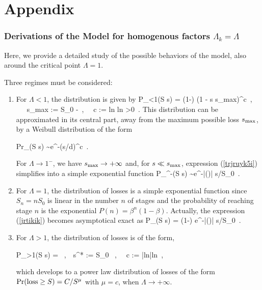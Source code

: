 \section*{Appendix}



\subsubsection{Derivations of the Model for homogenous factors $\Lambda_k = \Lambda$}
\label{derivation}
Here, we provide a detailed study of the possible behaviors of the model, also around the critical point $\Lambda =1$.

Three regimes must be considered:
\begin{enumerate}
\item For $\Lambda < 1$, the distribution is given by
\be
P_{\Lambda <1}(S  \geq s) = (1-\beta) \left(1 - {s \over s_{\rm max}}\right)^c~, ~~~s_{\rm max} := {S_0 \Lambda {}-\Lambda}~, ~~c := {\rm{ln}{\beta} 
\over \rm{ln}{\Lambda}} >0~.
\label{trjruyk5i}
\ee
This distribution can be approximated in its central part, away from the maximum possible loss $s_{\rm max}$,
by a Weibull distribution of the form

\be
{\rm Pr}_{\rm }({\rm S} \geq s) \sim e^{-(s/d)^{c}}~.
\label{trjeargquju}
\ee

For $\Lambda \to 1^-$, 
we have $s_{\rm max} \to +\infty$ and, for $s \ll s_{\rm max}$,
expression (\ref{trjruyk5i}) simplifies into a simple exponential function 
\be
P_{\Lambda {}^-}(S  \geq s) \sim e^{-|\ln(\beta)| s/S_0}~.
\label{jrtikik}
\ee

\item For $\Lambda = 1$, the distribution of losses  is a simple exponential function since $S_{n} = n S_{0}$ is linear in the number $n$ of
stages and the probability of reaching stage $n$ is the exponential
$P(n) = \beta^{n} (1-\beta)$. Actually, the expression
(\ref{jrtikik}) becomes asymptotical exact as
\be
P_{}(S  \geq s) = (1-\beta) e^{-|\ln(\beta)| s/S_0}~.
\label{jrtikik}
\ee


\item For $\Lambda > 1$, the distribution of losses is of the form,

\be
P_{\Lambda >1}(S  \geq s) = ~,~~s^{*} := {S_0 \Lambda \over {}}~, ~~c := {|\rm{ln}{\beta}|\over \rm{ln}{\Lambda}}~,
\label{jrtisdfjl}
\ee

which develops to a power law distribution of losses of the form
${\rm Pr}({\rm loss} \geq S) = C/S^{\mu}$ with $\mu = c$, when $\Lambda \rightarrow +\infty$.

\end{enumerate}
